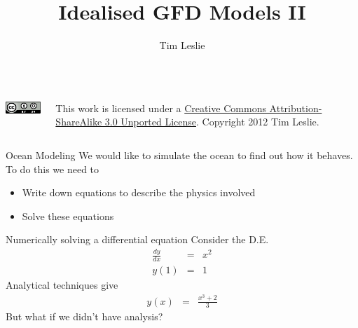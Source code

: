 \documentclass[a4paper]{beamer}
\title{Idealised GFD Models II}
\author{Tim Leslie}\institute{Breakaway Consulting Pty. Ltd.\\Climate Change Research Centre}
\begin{document}
\begin{frame}
\titlepage
\begin{columns}
    \begin{column}{0.25\textwidth}
      \includegraphics[keepaspectratio]{CC-BY-SA.png}
    \end{column}
    \begin{column}{0.75\textwidth}
      This work is licensed under a \href{http://creativecommons.org/licenses/by-sa/3.0/}{Creative Commons Attribution-ShareAlike 3.0 Unported License}. Copyright 2012 Tim Leslie.
    \end{column}
\end{columns}
\end{frame}

\begin{frame}{Ocean Modeling}
We would like to simulate the ocean to find out how it behaves. To do this we need to
\begin{itemize}
\item Write down equations to describe the physics involved
\item Solve these equations
\end{itemize}
\end{frame}


\begin{frame}{Numerically solving a differential equation}
Consider the D.E.
\begin{eqnarray}
\frac{d y}{d x} & = & x^2\\
y(1) & = & 1
\end{eqnarray}
Analytical techniques give
\begin{eqnarray}
y(x) & = & \frac{x^3 + 2}{3}
\end{eqnarray}
But what if we didn't have analysis?
\end{frame}
\end{document}
